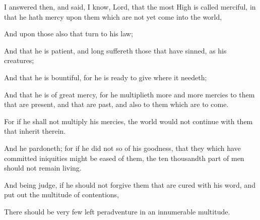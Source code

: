 {\par }{\PP {}I answered then, and said, I know, Lord, that the most High is called merciful, in that he hath mercy upon them which are not yet come into the world,
\par }{\PP {}And upon those also that turn to his law;
\par }{\PP {}And that he is patient, and long suffereth those that have sinned, as his creatures;
\par }{\PP {}And that he is bountiful, for he is ready to give where it needeth;
\par }{\PP {}And that he is of great mercy, for he multiplieth more and more mercies to them that are present, and that are past, and also to them which are to come.
\par }{\PP {}For if he shall not multiply his mercies, the world would not continue with them that inherit therein.
\par }{\PP {}And he pardoneth; for if he did not so of his goodness, that they which have committed iniquities might be eased of them, the ten thousandth part of men should not remain living.
\par }{\PP {}And being judge, if he should not forgive them that are cured with his word, and put out the multitude of contentions,
\par }{\PP {}There should be very few left peradventure in an innumerable multitude.

}
